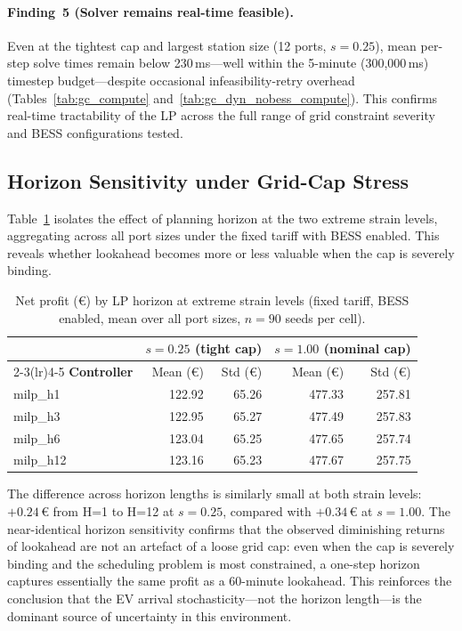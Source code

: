\paragraph{Finding~5 (Solver remains real-time feasible).}
Even at the tightest cap and largest station size (12 ports, $s=0.25$),
mean per-step solve times remain below 230\,ms—well within the 5-minute
(300{,}000\,ms) timestep budget—despite occasional infeasibility-retry
overhead (Tables~\ref{tab:gc_compute} and~\ref{tab:gc_dyn_nobess_compute}).
This confirms real-time tractability of the LP across the full range of grid
constraint severity and BESS configurations tested.

\subsection{Horizon Sensitivity under Grid-Cap Stress}
\label{subsec:gc_horizon}

Table~\ref{tab:gc_horizon_comparison} isolates the effect of planning horizon
at the two extreme strain levels, aggregating across all port sizes under the
fixed tariff with BESS enabled.  This reveals whether lookahead becomes more
or less valuable when the cap is severely binding.

\begin{table}[!htb]
\centering
\caption{Net profit (€) by LP horizon at extreme strain levels
         (fixed tariff, BESS enabled, mean over all port sizes,
         $n=90$ seeds per cell).}
\label{tab:gc_horizon_comparison}
\begin{tabular}{l rr rr}
\toprule
 & \multicolumn{2}{c}{$s = 0.25$ (tight cap)}
 & \multicolumn{2}{c}{$s = 1.00$ (nominal cap)} \\
\cmidrule(lr){2-3}\cmidrule(lr){4-5}
\textbf{Controller} & Mean (€) & Std (€) & Mean (€) & Std (€) \\
\midrule
milp\_h1  & 122.92 & 65.26 & 477.33 & 257.81 \\
milp\_h3  & 122.95 & 65.27 & 477.49 & 257.83 \\
milp\_h6  & 123.04 & 65.25 & 477.65 & 257.74 \\
milp\_h12 & 123.16 & 65.23 & 477.67 & 257.75 \\
\bottomrule
\end{tabular}
\end{table}

The difference across horizon lengths is similarly small at both strain
levels: $+0.24$\,€ from H=1 to H=12 at $s=0.25$, compared with $+0.34$\,€
at $s=1.00$.  The near-identical horizon sensitivity confirms that the
observed diminishing returns of lookahead are not an artefact of a loose
grid cap: even when the cap is severely binding and the scheduling problem is
most constrained, a one-step horizon captures essentially the same profit as a
60-minute lookahead.  This reinforces the conclusion that the EV arrival
stochasticity—not the horizon length—is the dominant source of uncertainty in
this environment.


